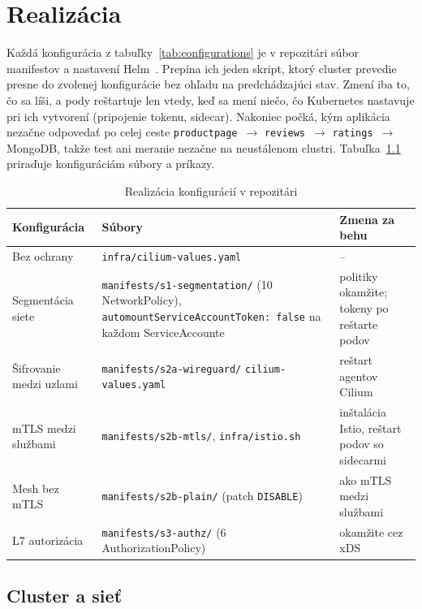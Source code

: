 \chapter{Realizácia}
\label{ch:implementation}

Každá konfigurácia z tabuľky~\ref{tab:configurations} je v repozitári súbor manifestov a nastavení Helm~\cite{helm}. Prepína ich jeden skript, ktorý cluster prevedie presne do zvolenej konfigurácie bez ohľadu na predchádzajúci stav. Zmení iba to, čo sa líši, a pody reštartuje len vtedy, keď sa mení niečo, čo Kubernetes nastavuje pri ich vytvorení (pripojenie tokenu, sidecar). Nakoniec počká, kým aplikácia nezačne odpovedať po celej ceste \texttt{productpage}~$\rightarrow$ \texttt{reviews}~$\rightarrow$ \texttt{ratings}~$\rightarrow$ MongoDB, takže test ani meranie nezačne na neustálenom clustri. Tabuľka~\ref{tab:implementation} priraďuje konfiguráciám súbory a príkazy.

\begin{table}[ht!]
  \centering
  \caption{Realizácia konfigurácií v repozitári}
  \label{tab:implementation}
  \footnotesize
  \renewcommand{\arraystretch}{1.15}
  \begin{tabularx}{\textwidth}{@{}>{\raggedright\arraybackslash}p{3.2cm}>{\raggedright\arraybackslash}X>{\raggedright\arraybackslash}p{3.6cm}@{}}
    \toprule
    Konfigurácia & Súbory & Zmena za behu \\
    \midrule
    Bez ochrany & \texttt{infra/cilium-values.yaml} & -- \\
    Segmentácia siete & \texttt{manifests/s1-segmentation/} (10 NetworkPolicy), \texttt{automountServiceAccountToken: false} na každom ServiceAccounte & politiky okamžite; tokeny po reštarte podov \\
    Šifrovanie medzi uzlami & \texttt{manifests/s2a-wireguard/} \texttt{cilium-values.yaml} & reštart agentov Cilium \\
    mTLS medzi službami & \texttt{manifests/s2b-mtls/}, \texttt{infra/istio.sh} & inštalácia Istio, reštart podov so sidecarmi \\
    Mesh bez mTLS & \texttt{manifests/s2b-plain/} (patch \texttt{DISABLE}) & ako mTLS medzi službami \\
    L7 autorizácia & \texttt{manifests/s3-authz/} (6 AuthorizationPolicy) & okamžite cez xDS \\
    \bottomrule
  \end{tabularx}
\end{table}

\section{Cluster a sieť}

